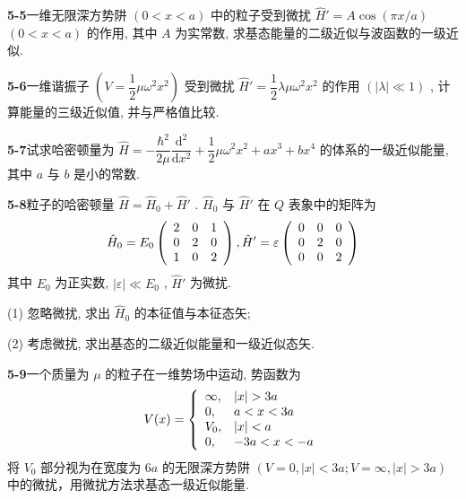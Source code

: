 \vfill

\newpage

\textbf{5-5}\quad 一维无限深方势阱 $\displaystyle (0 < x < a)$ 中的粒子受到微扰 $\displaystyle \hat{H}' = A\cos (\pi x / a)$ $\displaystyle (0 < x < a)$ 的作用, 其中 $\displaystyle A$ 为实常数, 求基态能量的二级近似与波函数的一级近似.

\vfill

\newpage

\textbf{5-6}\quad 一维谐振子 $\displaystyle \left(V = \dfrac{1}{2}\mu \omega^2 x^2\right)$ 受到微扰 $\displaystyle \hat{H}' = \dfrac{1}{2}\lambda \mu \omega^2 x^2$ 的作用 $\displaystyle (|\lambda| \ll 1)$ , 计算能量的三级近似值, 并与严格值比较.

\vfill

\newpage

\textbf{5-7}\quad 试求哈密顿量为 $\displaystyle \hat{H} = -\dfrac{\hbar^2}{2\mu}\dfrac{\mathrm{d}^2}{\mathrm{d}x^2} +\dfrac{1}{2}\mu \omega^2 x^2 +ax^3 +bx^4$ 的体系的一级近似能量, 其中 $\displaystyle a$ 与 $\displaystyle b$ 是小的常数.

\vfill

\newpage

\textbf{5-8}\quad 粒子的哈密顿量 $\displaystyle \hat{H} = \hat{H}_0 + \hat{H}'$ . $\displaystyle \hat{H}_0$ 与 $\displaystyle \hat{H}'$ 在 $\displaystyle Q$ 表象中的矩阵为
$$
\hat {H} _ {0} = E _ {0} \left( \begin{array}{c c c} 2 & 0 & 1 \\ 0 & 2 & 0 \\ 1 & 0 & 2 \end{array} \right), \hat {H} ^ {\prime} = \varepsilon \left( \begin{array}{c c c} 0 & 0 & 0 \\ 0 & 2 & 0 \\ 0 & 0 & 2 \end{array} \right)
$$
其中 $\displaystyle E_0$ 为正实数, $\displaystyle \left|\varepsilon\right| \ll E_0$ , $\displaystyle \hat{H}'$ 为微扰.

(1) 忽略微扰, 求出 $\displaystyle \hat{H}_0$ 的本征值与本征态矢;

(2) 考虑微扰, 求出基态的二级近似能量和一级近似态矢.

\vfill

\newpage

\textbf{5-9}\quad 一个质量为 $\displaystyle \mu$ 的粒子在一维势场中运动, 势函数为
$$
V (x) = \left\{ \begin{array}{l l} \infty , & | x | > 3 a \\ 0, & a <   x <   3 a \\ V _ {0}, & | x | <   a \\ 0, & - 3 a <   x <   - a \end{array} \right.
$$
将 $\displaystyle V_{0}$ 部分视为在宽度为 $\displaystyle 6a$ 的无限深方势阱 $\displaystyle (V = 0, |x| < 3a; V = \infty, |x| > 3a)$ 中的微扰，用微扰方法求基态一级近似能量.

